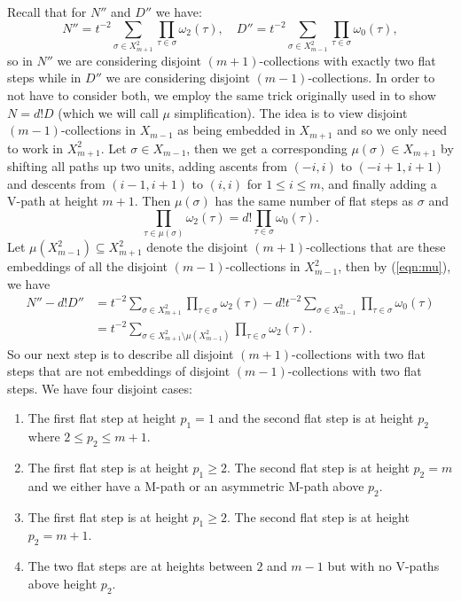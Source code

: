 \documentclass[11pt]{article}
\theoremstyle{mythm}
\begin{document}
Recall that for $N''$ and $D''$ we have:
\begin{equation*}
N'' = t^{-2}\sum\limits_{\sigma\in X_{m+1}^2}\prod\limits_{\tau\in\sigma}\omega_2(\tau),\quad D'' = t^{-2}\sum\limits_{\sigma\in X_{m-1}^2}\prod\limits_{\tau\in\sigma}\omega_0(\tau),
\end{equation*}
so in $N''$ we are considering disjoint $(m+1)$-collections with exactly two flat steps while in $D''$ we are considering disjoint $(m-1)$-collections. In order to not have to consider both, we employ the same trick originally used in \cite{willerton_magnitude_2017} to show $N = d!D$ (which we will call $\mu$ simplification). The idea is to view disjoint $(m-1)$-collections in $X_{m-1}$ as being embedded in $X_{m+1}$ and so we only need to work in $X_{m+1}^2$. Let $\sigma \in X_{m-1}$, then we get a corresponding $\mu(\sigma)\in X_{m+1}$ by shifting all paths up two units, adding ascents from $(-i,i)$ to $(-i+1,i+1)$ and descents from $(i-1,i+1)$ to $(i,i)$ for $1\leq i \leq m$, and finally adding a V-path at height $m+1$. Then $\mu(\sigma)$ has the same number of flat steps as $\sigma$ and
\begin{equation}\label{eqn:mu}
\prod\limits_{\tau\in\mu(\sigma)}\omega_2(\tau) = d!\prod\limits_{\tau\in\sigma}\omega_0(\tau).
\end{equation}
Let $\mu(X_{m-1}^2)\subseteq X_{m+1}^2$ denote the disjoint $(m+1)$-collections that are these embeddings of all the disjoint $(m-1)$-collections in $X_{m-1}^2$, then by (\ref{eqn:mu}), we have
\begin{align*}
N''-d!D'' &= t^{-2}\sum\limits_{\sigma\in X_{m+1}^2}\prod\limits_{\tau\in\sigma}\omega_2(\tau) - d!t^{-2}\sum\limits_{\sigma\in X_{m-1}^2}\prod\limits_{\tau\in\sigma}\omega_0(\tau) \\
&= t^{-2}\sum\limits_{\sigma\in X_{m+1}^2\setminus\mu(X_{m-1}^2)}\prod\limits_{\tau\in\sigma}\omega_2(\tau).
\end{align*}
So our next step is to describe all disjoint $(m+1)$-collections with two flat steps that are not embeddings of disjoint $(m-1)$-collections with two flat steps. We have four disjoint cases:
\begin{enumerate}
\item The first flat step at height $p_1=1$ and the second flat step is at height $p_2$ where $2\leq p_2\leq m+1$.
\item The first flat step is at height $p_1 \geq 2$. The second flat step is at height $p_2 = m$ and we either have a M-path or an asymmetric M-path above $p_2$.
\item The first flat step is at height $p_1 \geq 2$. The second flat step is at height $p_2 = m+1$.
\item The two flat steps are at heights between $2$ and $m-1$ but with no V-paths above height $p_2$.
\end{enumerate}
\end{document}
